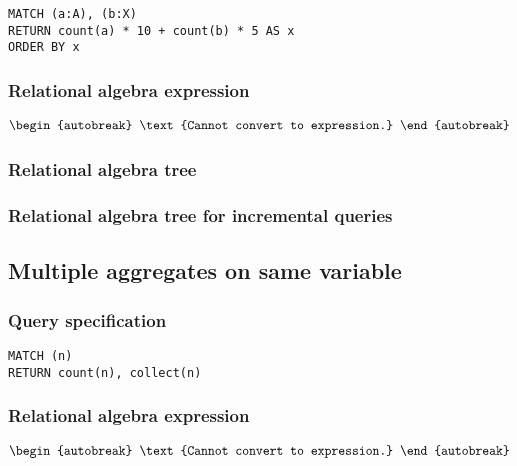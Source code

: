 \begin{lstlisting}
MATCH (a:A), (b:X)
RETURN count(a) * 10 + count(b) * 5 AS x
ORDER BY x
\end{lstlisting}

\subsubsection*{Relational algebra expression}

\begin{align*}
\begin{autobreak}
\text{Cannot convert to expression.}
\end{autobreak}
\end{align*}

\subsubsection*{Relational algebra tree}


\subsubsection*{Relational algebra tree for incremental queries}


\subsection{Multiple aggregates on same variable}

\subsubsection*{Query specification}

\begin{lstlisting}
MATCH (n)
RETURN count(n), collect(n)
\end{lstlisting}

\subsubsection*{Relational algebra expression}

\begin{align*}
\begin{autobreak}
\text{Cannot convert to expression.}
\end{autobreak}
\end{align*}

